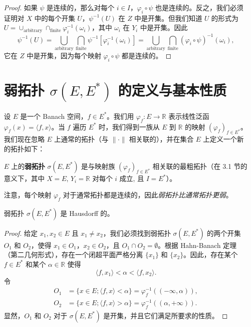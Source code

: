 \begin{proof}
如果 $\psi$ 是连续的，那么对每个 $i \in I$，$\varphi_i \circ \psi$ 也是连续的。反之，我们必须证明对 $X$ 中的每个开集 $U$，$\psi^{-1}(U)$ 在 $Z$ 中是开集。但我们知道 $U$ 的形式为 $U = \cup_{\text{arbitrary}} \cap_{\text{finite}} \varphi_i^{-1}(\omega_i)$，其中 $\omega_i$ 在 $Y_i$ 中是开集。因此
\[
\psi^{-1}(U) = \bigcup_{\text{arbitrary}} \bigcap_{\text{finite}} \psi^{-1}[\varphi_i^{-1}(\omega_i)] = \bigcup_{\text{arbitrary}} \bigcap_{\text{finite}} (\varphi_i \circ \psi)^{-1}(\omega_i),
\]
它在 $Z$ 中是开集，因为每个映射 $\varphi_i \circ \psi$ 都是连续的。
\end{proof}

\section{弱拓扑 $\sigma(E, E^*)$ 的定义与基本性质}

设 $E$ 是一个 Banach 空间，$f \in E^*$。我们用 $\varphi_f : E \to \mathbb{R}$ 表示线性泛函 $\varphi_f(x) = \langle f, x \rangle$。当 $f$ 遍历 $E^*$ 时，我们得到一族从 $E$ 到 $\mathbb{R}$ 的映射 $(\varphi_f)_{f \in E^*}$。我们现在忽略 $E$ 上通常的拓扑（与 $\| \cdot \|$ 相关联的），并在集合 $E$ 上定义一个新的拓扑如下：

\begin{definition}\label{def_weak_topology}
$E$ 上的\textbf{弱拓扑} $\sigma(E, E^*)$ 是与映射族 $(\varphi_f)_{f \in E^*}$ 相关联的最粗拓扑（在 3.1 节的意义下，其中 $X=E$, $Y_i=\mathbb{R}$ 对每个 $i$ 成立, 且 $I=E^*$）。
\end{definition}

注意，每个映射 $\varphi_f$ 对于通常拓扑都是连续的，因此\textit{弱拓扑比通常拓扑更弱}。

\begin{proposition}\label{prop3.3}
弱拓扑 $\sigma(E, E^*)$ 是 Hausdorff 的。
\end{proposition}

\begin{proof}
给定 $x_1, x_2 \in E$ 且 $x_1 \neq x_2$，我们必须找到弱拓扑 $\sigma(E, E^*)$ 的两个开集 $O_1$ 和 $O_2$，使得 $x_1 \in O_1$，$x_2 \in O_2$，且 $O_1 \cap O_2 = \emptyset$。根据 Hahn-Banach 定理（第二几何形式），存在一个闭超平面严格分离 $\{x_1\}$ 和 $\{x_2\}$。因此，存在某个 $f \in E^*$ 和某个 $\alpha \in \mathbb{R}$ 使得
\[
\langle f, x_1 \rangle < \alpha < \langle f, x_2 \rangle.
\]
令
\begin{align*}
O_1 &= \{ x \in E; \langle f, x \rangle < \alpha \} = \varphi_f^{-1}((-\infty, \alpha)), \\
O_2 &= \{ x \in E; \langle f, x \rangle > \alpha \} = \varphi_f^{-1}((\alpha, +\infty)).
\end{align*}
显然，$O_1$ 和 $O_2$ 对于 $\sigma(E, E^*)$ 是开集，并且它们满足所要求的性质。
\end{proof}

